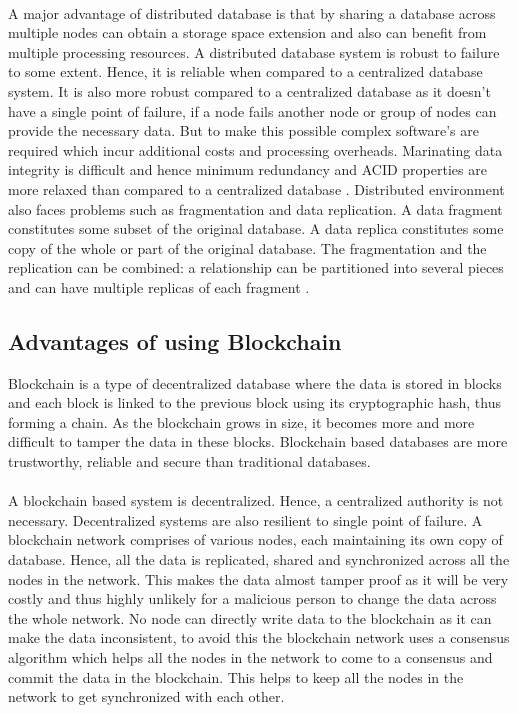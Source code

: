 \documentclass{article}
\begin{document}
        \paragraph{}
        A major advantage of distributed database is that by sharing a database across  multiple nodes can obtain a storage space extension and also can benefit from multiple processing resources. A distributed database system is robust to failure to some extent. Hence, it is reliable when compared to a  centralized database system. It is also more robust compared to a centralized database as it doesn't have a single point of failure, if a node fails another node or group of nodes can provide the necessary data. But to make this possible complex software's are required which incur additional costs and processing overheads. Marinating data integrity is difficult and hence minimum redundancy and ACID properties are more relaxed than compared to a centralized database \cite{centralizeddistributeddatabases}. Distributed environment also faces problems such as fragmentation and data replication. A data fragment constitutes some subset of the original database. A data replica constitutes some copy of the whole or part of the original database. The fragmentation and the replication can be combined: a relationship can be partitioned into several pieces and can have multiple replicas of each fragment \cite{distributedsystems}.
        
    \subsection{Advantages of using Blockchain}
        Blockchain is a type of decentralized database where the data is stored in blocks and each block is linked to the previous block using its cryptographic hash, thus forming a chain. As the blockchain grows in size, it becomes more and more difficult to tamper the data in these blocks. Blockchain based databases are more trustworthy, reliable and secure than traditional databases.

        \paragraph{}
        A blockchain based system is decentralized. Hence, a centralized authority is not necessary. Decentralized systems are also resilient to single point of failure. A blockchain network comprises of various nodes, each maintaining its own copy of database. Hence, all the data is replicated, shared and synchronized across all the nodes in the network. This makes the data almost tamper proof as it will be very costly and thus highly unlikely for a malicious person to change the data across the whole network. No node can directly write data to the blockchain as it can make the data inconsistent, to avoid this the blockchain network uses a consensus algorithm which helps all the nodes in the network to come to a consensus and commit the data in the blockchain. This helps to keep all the nodes in the network to get synchronized with each other. 
\end{document}
